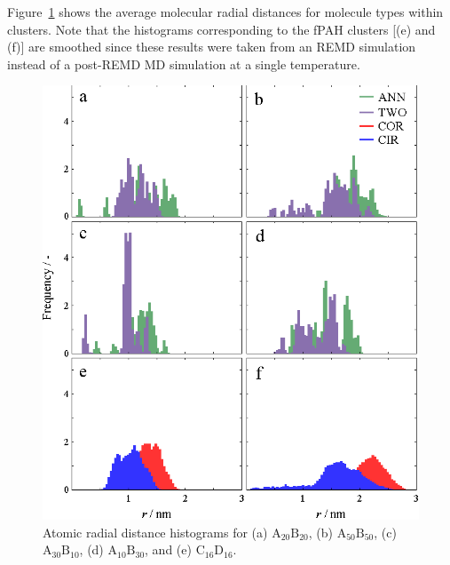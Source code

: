 Figure~\ref{figSI:radialdists_molec} shows the average molecular radial distances for molecule types within clusters. Note that the histograms corresponding to the fPAH clusters [(e) and (f)] are smoothed since these results were taken from an REMD simulation instead of a post-REMD MD simulation at a single temperature.
%
\begin{figure}[!tbh]
\centering
\includegraphics[width=0.5\linewidth]{Figures/molec_histograms.eps}
\caption{Atomic radial distance histograms for (a) $\text{A}_{\text{20}}\text{B}_{\text{20}}$, (b) $\text{A}_{\text{50}}\text{B}_{\text{50}}$, (c) $\text{A}_{\text{30}}\text{B}_{\text{10}}$, (d) $\text{A}_{\text{10}}\text{B}_{\text{30}}$, and (e) $\text{C}_{\text{16}}\text{D}_{\text{16}}$.}
\label{figSI:radialdists_molec}
\end{figure}
%

\newpage
